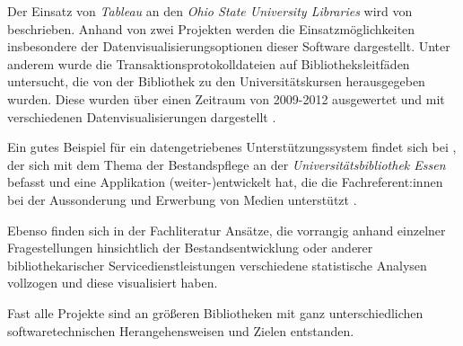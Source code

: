 

Der Einsatz von \textit{Tableau} an den \textit{Ohio State University Libraries} wird von  beschrieben. 
Anhand von zwei Projekten werden die Einsatzmöglichkeiten insbesondere der Datenvisualisierungsoptionen 
dieser Software dargestellt. Unter anderem wurde die Transaktionsprotokolldateien auf Bibliotheksleitfäden untersucht, 
die von der Bibliothek zu den Universitätskursen herausgegeben wurden.  Diese wurden über einen Zeitraum von 2009-2012 ausgewertet und 
mit verschiedenen Datenvisualisierungen dargestellt \cite[vgl.][469 f.]{murphy_data_2013}.

Ein gutes Beispiel für ein datengetriebenes Unterstützungssystem findet sich bei , der sich mit dem Thema der Bestandspflege an der
\textit{Universitätsbibliothek Essen} befasst und eine Applikation (weiter-)entwickelt hat, die
die Fachreferent:innen bei der Aussonderung und Erwerbung von Medien
unterstützt \cite{spielberg_eike_t_fachref-assistent_nodate}.


Ebenso finden sich in der Fachliteratur Ansätze, die vorrangig anhand einzelner
Fragestellungen hinsichtlich der Bestandsentwicklung\cite{hughes_long-term_2016} oder anderer
bibliothekarischer Servicedienstleistungen\cite{kutlay_shiny_2020, knievel_use_2006,meyer_using_2018} verschiedene statistische Analysen
vollzogen und diese visualisiert haben.


Fast alle Projekte sind an größeren
Bibliotheken mit ganz unterschiedlichen softwaretechnischen
Herangehensweisen\cite{finch_using_2016, wiegand_visualizing_2013} und Zielen\cite{phetteplace_effectively_2012} entstanden.

